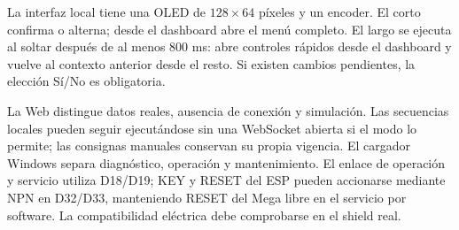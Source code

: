La interfaz local tiene una OLED de $128\times64$ píxeles y un encoder. El corto confirma o alterna; desde el dashboard abre el menú completo. El largo se ejecuta al soltar después de al menos 800 ms: abre controles rápidos desde el dashboard y vuelve al contexto anterior desde el resto. Si existen cambios pendientes, la elección Sí/No es obligatoria.

La Web distingue datos reales, ausencia de conexión y simulación. Las secuencias locales pueden seguir ejecutándose sin una WebSocket abierta si el modo lo permite; las consignas manuales conservan su propia vigencia. El cargador Windows separa diagnóstico, operación y mantenimiento. El enlace de operación y servicio utiliza D18/D19; KEY y RESET del ESP pueden accionarse mediante NPN en D32/D33, manteniendo RESET del Mega libre en el servicio por software. La compatibilidad eléctrica debe comprobarse en el shield real.
\FloatBarrier
